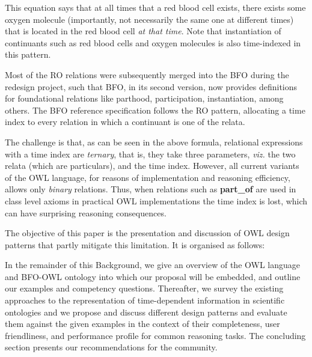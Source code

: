 This equation says that at all times that a red blood cell exists, there exists some oxygen molecule (importantly, not necessarily the same one at different times) that is located in the red blood cell \emph{at that time}. Note that instantiation of continuants such as red blood cells and oxygen molecules is also time-indexed in this pattern. 

Most of the RO relations 
were subsequently merged into the BFO during the redesign project, such that BFO, in its second version, now provides definitions for foundational 
relations like parthood, participation, instantiation, among others. The BFO reference specification follows the RO pattern, 
allocating a time index to every relation in which a continuant is one of the relata. 

The challenge is that, as can be seen in the above formula, relational expressions with a time index are \emph{ternary}, that is, they take three parameters, \emph{viz.} the two relata (which are particulars), and the time index. However, all current variants of the OWL language, for reasons of implementation and reasoning efficiency, allows only \emph{binary} relations. 
Thus, when relations such as \textbf{part\_of} are used in class level axioms
in practical OWL implementations 
the time index is lost, which can have surprising reasoning consequences. 


The objective of this paper is the presentation and discussion of OWL design patterns that partly mitigate this limitation. It is organised as follows:

In the remainder of this Background, we give an overview of the OWL language and BFO-OWL ontology into which our proposal will be embedded, and outline our examples and competency questions.
Thereafter, we survey the existing approaches to the representation of time-dependent information in scientific ontologies and
we propose and discuss different design patterns and evaluate them against the given examples in the context of their completeness, user friendliness, and performance profile for common reasoning tasks.
The concluding section presents our recommendations for the community.

